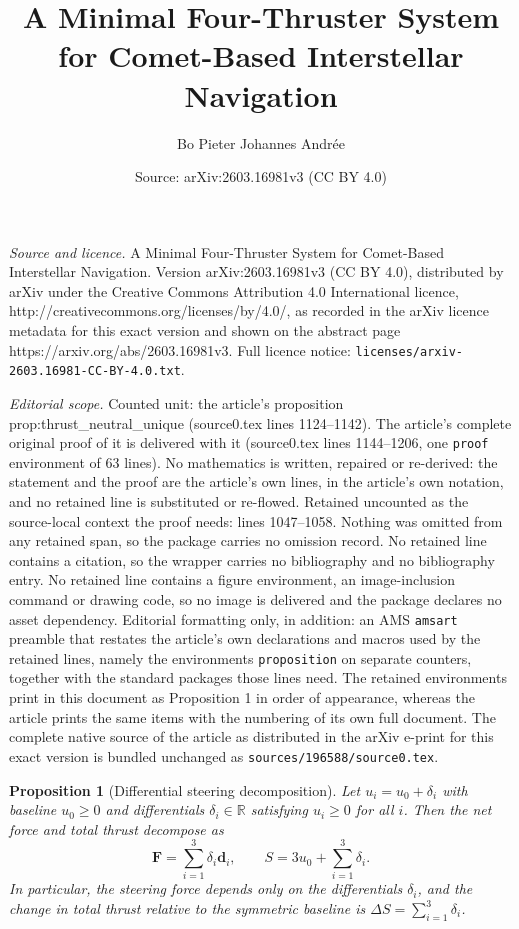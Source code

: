 \documentclass[10pt,a4paper]{amsart}
\title{A Minimal Four-Thruster System for Comet-Based Interstellar Navigation}
\author{Bo Pieter Johannes Andr\'ee}
\date{Source: arXiv:2603.16981v3 (CC BY 4.0)}
\newtheorem{proposition}{Proposition}
\begin{document}
\maketitle

\noindent\emph{Source and licence.} A Minimal Four-Thruster System for Comet-Based Interstellar Navigation. Version arXiv:2603.16981v3 (CC BY 4.0), distributed by arXiv under the Creative Commons Attribution 4.0 International licence, http://creativecommons.org/licenses/by/4.0/, as recorded in the arXiv licence metadata for this exact version and shown on the abstract page https://arxiv.org/abs/2603.16981v3. Full licence notice: \texttt{licenses/arxiv-2603.16981-CC-BY-4.0.txt}.\par\smallskip

\noindent\textit{Editorial scope.} Counted unit: the article's proposition prop:thrust\_neutral\_unique (source0.tex lines 1124--1142). The article's complete original proof of it is delivered with it (source0.tex lines 1144--1206, one \texttt{proof} environment of 63 lines). No mathematics is written, repaired or re-derived: the statement and the proof are the article's own lines, in the article's own notation, and no retained line is substituted or re-flowed.  Retained uncounted as the source-local context the proof needs: lines 1047--1058.  Nothing was omitted from any retained span, so the package carries no omission record.  No retained line contains a citation, so the wrapper carries no bibliography and no bibliography entry.  No retained line contains a figure environment, an image-inclusion command or drawing code, so no image is delivered and the package declares no asset dependency.  Editorial formatting only, in addition: an AMS \texttt{amsart} preamble that restates the article's own declarations and macros used by the retained lines, namely the environments \texttt{proposition} on separate counters, together with the standard packages those lines need.  The retained environments print in this document as Proposition 1 in order of appearance, whereas the article prints the same items with the numbering of its own full document.  The complete native source of the article as distributed in the arXiv e-print for this exact version is bundled unchanged as \texttt{sources/196588/source0.tex}.
\begin{proposition}[Differential steering decomposition]
\label{prop:differential_decomposition}
Let $u_i = u_0 + \delta_i$ with baseline $u_0 \ge 0$ and differentials $\delta_i \in \mathbb{R}$ 
satisfying $u_i \ge 0$ for all $i$. Then the net force and total thrust decompose as
\begin{equation}
\mathbf F = \sum_{i=1}^{3} \delta_i \mathbf d_i,
\qquad
S = 3u_0 + \sum_{i=1}^{3} \delta_i.
\end{equation}
In particular, the steering force depends only on the differentials $\delta_i$, and the change 
in total thrust relative to the symmetric baseline is $\Delta S = \sum_{i=1}^{3} \delta_i$.
\end{proposition}
\end{document}
